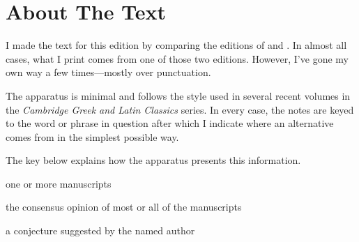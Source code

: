 \section*{About The Text}

I made the text for this edition by comparing the editions of \citet{sb1985}
and \citet{mankin1995}. In almost all cases, what I print comes from one of
those two editions. However, I've gone my own way a few times---mostly over
punctuation.

The apparatus is minimal and follows the style used in several recent volumes
in the \textit{Cambridge Greek and Latin Classics} series. In every case, the
notes are keyed to the word or phrase in question after which I indicate
where an alternative comes from in the simplest possible way.

The key below explains how the apparatus presents this information.

\begin{description}%
    [style=sameline,leftmargin=70pt,labelwidth=\widthof{\textbf{Name}}]
    \item[m] one or more manuscripts
    \item[mss] the consensus opinion of most or all of the manuscripts
    \item[Name] a conjecture suggested by the named author
\end{description}
